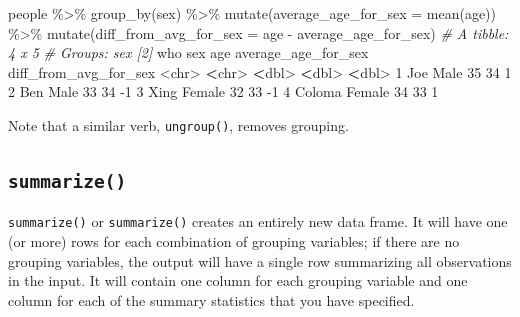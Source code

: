 \documentclass[
]{book}
\newenvironment{Shaded}{\begin{snugshade}}{\end{snugshade}}
\newcommand{\AttributeTok}[1]{\textcolor[rgb]{0.77,0.63,0.00}{#1}}
\newcommand{\CommentTok}[1]{\textcolor[rgb]{0.56,0.35,0.01}{\textit{#1}}}
\newcommand{\DecValTok}[1]{\textcolor[rgb]{0.00,0.00,0.81}{#1}}
\newcommand{\ErrorTok}[1]{\textcolor[rgb]{0.64,0.00,0.00}{\textbf{#1}}}
\newcommand{\FunctionTok}[1]{\textcolor[rgb]{0.00,0.00,0.00}{#1}}
\newcommand{\NormalTok}[1]{#1}
\newcommand{\SpecialCharTok}[1]{\textcolor[rgb]{0.00,0.00,0.00}{#1}}
\begin{document}
\begin{Shaded}
\begin{Highlighting}[]
\NormalTok{people }\SpecialCharTok{\%\textgreater{}\%} 
  \FunctionTok{group\_by}\NormalTok{(sex) }\SpecialCharTok{\%\textgreater{}\%}
  \FunctionTok{mutate}\NormalTok{(}\AttributeTok{average\_age\_for\_sex =} \FunctionTok{mean}\NormalTok{(age)) }\SpecialCharTok{\%\textgreater{}\%}
  \FunctionTok{mutate}\NormalTok{(}\AttributeTok{diff\_from\_avg\_for\_sex =}\NormalTok{ age }\SpecialCharTok{{-}}\NormalTok{ average\_age\_for\_sex)}
\CommentTok{\# A tibble: 4 x 5}
\CommentTok{\# Groups:   sex [2]}
\NormalTok{  who    sex      age average\_age\_for\_sex diff\_from\_avg\_for\_sex}
  \SpecialCharTok{\textless{}}\NormalTok{chr}\SpecialCharTok{\textgreater{}}  \ErrorTok{\textless{}}\NormalTok{chr}\SpecialCharTok{\textgreater{}}  \ErrorTok{\textless{}}\NormalTok{dbl}\SpecialCharTok{\textgreater{}}               \ErrorTok{\textless{}}\NormalTok{dbl}\SpecialCharTok{\textgreater{}}                 \ErrorTok{\textless{}}\NormalTok{dbl}\SpecialCharTok{\textgreater{}}
\DecValTok{1}\NormalTok{ Joe    Male      }\DecValTok{35}                  \DecValTok{34}                     \DecValTok{1}
\DecValTok{2}\NormalTok{ Ben    Male      }\DecValTok{33}                  \DecValTok{34}                    \SpecialCharTok{{-}}\DecValTok{1}
\DecValTok{3}\NormalTok{ Xing   Female    }\DecValTok{32}                  \DecValTok{33}                    \SpecialCharTok{{-}}\DecValTok{1}
\DecValTok{4}\NormalTok{ Coloma Female    }\DecValTok{34}                  \DecValTok{33}                     \DecValTok{1}
\end{Highlighting}
\end{Shaded}

Note that a similar verb, \texttt{ungroup()}, removes grouping.

\hypertarget{summarize}{%
\subsection*{\texorpdfstring{\texttt{summarize()}}{summarize()}}\label{summarize}}

\texttt{summarize()} or \texttt{summarize()} creates an entirely new data frame. It will have one (or more) rows for each combination of grouping variables; if there are no grouping variables, the output will have a single row summarizing all observations in the input. It will contain one column for each grouping variable and one column for each of the summary statistics that you have specified.
\end{document}
